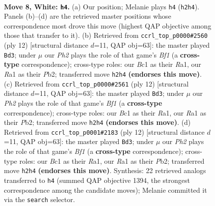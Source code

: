 \documentclass[11pt]{article}
\begin{document}
\begin{figure}[p]\centering
\begin{subfigure}{0.46\textwidth}\centering
\resizebox{\linewidth}{!}{%
\newchessgame
\chessboard[
  setfen={r1bqkb1r/ppp2pp1/4pn2/7p/3P4/3B1N2/PPP2PPP/R1BQK2R w KQkq - 0 8},
  showmover=false,
  pgfstyle=straightmove, color=movearrow, markmove={h2-h4}
]}
\caption{}
\end{subfigure}\hfill
\begin{subfigure}{0.46\textwidth}\centering
\resizebox{\linewidth}{!}{%
\newchessgame
\chessboard[
  setfen={r1bqkb1r/ppp2ppp/4pn2/8/3P4/5N2/PPP2PPP/R1BQKB1R w KQkq - 0 7},
  showmover=false,
  pgfstyle=straightmove, color=movearrow, markmove={f1-d3}
]}
\caption{}
\end{subfigure}
\\[4pt]
\begin{subfigure}{0.46\textwidth}\centering
\resizebox{\linewidth}{!}{%
\newchessgame
\chessboard[
  setfen={r1bqkb1r/ppp2ppp/4pn2/8/3P4/5N2/PPP2PPP/R1BQKB1R w KQkq - 0 7},
  showmover=false,
  pgfstyle=straightmove, color=movearrow, markmove={f1-d3}
]}
\caption{}
\end{subfigure}\hfill
\begin{subfigure}{0.46\textwidth}\centering
\resizebox{\linewidth}{!}{%
\newchessgame
\chessboard[
  setfen={r1bqkb1r/ppp2ppp/4pn2/8/3P4/5N2/PPP2PPP/R1BQKB1R w KQkq - 0 7},
  showmover=false,
  pgfstyle=straightmove, color=movearrow, markmove={f1-d3}
]}
\caption{}
\end{subfigure}
\caption{\textbf{Move 8, White: \texttt{h4}.} (a) Our position; Melanie plays \texttt{h4} (\texttt{h2h4}). Panels (b)--(d) are the retrieved master positions whose correspondence most drove this move (highest QAP objective among those that transfer to it). (b) Retrieved from \texttt{ccrl\_top\_p0000\#2560} (ply 12) [structural distance $d$=11, QAP obj=63]: the master played \texttt{Bd3}; under $\mu$ our \emph{Ph2} plays the role of that game's \emph{Bf1} (a \textbf{cross-type} correspondence); cross-type roles: our \emph{B}c1 as their \emph{R}a1, our \emph{R}a1 as their \emph{P}b2; transferred move \texttt{h2h4} \textbf{(endorses this move)}. (c) Retrieved from \texttt{ccrl\_top\_p0000\#2561} (ply 12) [structural distance $d$=11, QAP obj=63]: the master played \texttt{Bd3}; under $\mu$ our \emph{Ph2} plays the role of that game's \emph{Bf1} (a \textbf{cross-type} correspondence); cross-type roles: our \emph{B}c1 as their \emph{R}a1, our \emph{R}a1 as their \emph{P}b2; transferred move \texttt{h2h4} \textbf{(endorses this move)}. (d) Retrieved from \texttt{ccrl\_top\_p0001\#2183} (ply 12) [structural distance $d$=11, QAP obj=63]: the master played \texttt{Bd3}; under $\mu$ our \emph{Ph2} plays the role of that game's \emph{Bf1} (a \textbf{cross-type} correspondence); cross-type roles: our \emph{B}c1 as their \emph{R}a1, our \emph{R}a1 as their \emph{P}b2; transferred move \texttt{h2h4} \textbf{(endorses this move)}. Synthesis: 22 retrieved analogs transferred to \texttt{h4} (summed QAP objective 1394, the strongest correspondence among the candidate moves); Melanie committed it via the \texttt{search} selector.}
\label{fig:thought-m14}
\end{figure}
\end{document}
